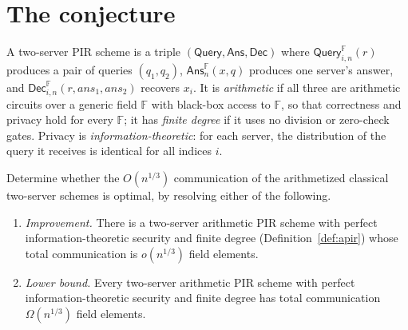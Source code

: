 \documentclass{aicr-conjecture}
\newcommand{\F}{\mathbb{F}}
\newcommand{\Query}{\mathsf{Query}}
\newcommand{\Ans}{\mathsf{Ans}}
\newcommand{\Dec}{\mathsf{Dec}}
\begin{document}
\section{The conjecture}\label{sec:conjectures}

\begin{definition}\label{def:apir}
A two-server PIR scheme is a triple $(\Query, \Ans, \Dec)$ where
$\Query^{\F}_{i,n}(r)$ produces a pair of queries $(q_{1}, q_{2})$,
$\Ans^{\F}_{n}(x, q)$ produces one server's answer, and
$\Dec^{\F}_{i,n}(r, \mathit{ans}_{1}, \mathit{ans}_{2})$ recovers
$x_{i}$. It is \emph{arithmetic} if all three are arithmetic circuits
over a generic field $\F$ with black-box access to $\F$, so that
correctness and privacy hold for every $\F$; it has \emph{finite degree}
if it uses no division or zero-check gates. Privacy is
\emph{information-theoretic}: for each server, the distribution of the
query it receives is identical for all indices $i$.
\end{definition}

\begin{conjecture}\label{conj:main}
Determine whether the $O(n^{1/3})$ communication of the arithmetized
classical two-server schemes is optimal, by resolving either of the
following.
\begin{enumerate}[nosep,label=(\alph*)]
  \item \emph{Improvement.} There is a two-server arithmetic PIR scheme
    with perfect information-theoretic security and finite degree
    (Definition~\ref{def:apir}) whose total communication is
    $o(n^{1/3})$ field elements.
  \item \emph{Lower bound.} Every two-server arithmetic PIR scheme with
    perfect information-theoretic security and finite degree has total
    communication $\Omega(n^{1/3})$ field elements.
\end{enumerate}
\end{conjecture}
\end{document}
